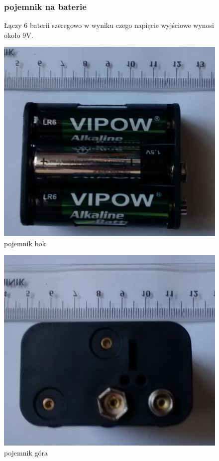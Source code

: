 \documentclass[a4paper,11pt]{article}
\def\SCALE{0.6}
\begin{document}
\begin{figure}[H]
	\subsubsection{pojemnik na baterie}
	Łączy 6 baterii szeregowo w wyniku czego napięcie wyjściowe wynosi około 9V.


	\centering
	\includegraphics[width=\SCALE
	\paperwidth]{pojemnik-1}
	\caption{pojemnik bok}



\end{figure}
\begin{figure}[H]
	\centering
	\includegraphics[width=\SCALE
	\paperwidth]{pojemnik-2}
	\caption{pojemnik góra}
\end{figure}	
\end{document}
